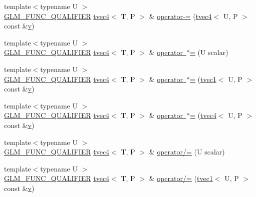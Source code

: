 \begin{DoxyCompactItemize}
\item 
{\footnotesize template$<$typename U $>$ }\\\mbox{\hyperlink{setup_8hpp_a33fdea6f91c5f834105f7415e2a64407}{G\+L\+M\+\_\+\+F\+U\+N\+C\+\_\+\+Q\+U\+A\+L\+I\+F\+I\+ER}} \mbox{\hyperlink{structglm_1_1tvec4}{tvec4}}$<$ T, P $>$ \& \mbox{\hyperlink{structglm_1_1tvec4_a75d65a025aeea5e7351d8c0113fabebb}{operator-\/=}} (\mbox{\hyperlink{structglm_1_1tvec4}{tvec4}}$<$ U, P $>$ const \&\mbox{\hyperlink{glad_8h_a14cfbe2fc2234f5504618905b69d1e06}{v}})
\item 
{\footnotesize template$<$typename U $>$ }\\\mbox{\hyperlink{setup_8hpp_a33fdea6f91c5f834105f7415e2a64407}{G\+L\+M\+\_\+\+F\+U\+N\+C\+\_\+\+Q\+U\+A\+L\+I\+F\+I\+ER}} \mbox{\hyperlink{structglm_1_1tvec4}{tvec4}}$<$ T, P $>$ \& \mbox{\hyperlink{structglm_1_1tvec4_a071e6503cba0d00b1827dc61f39005ba}{operator $\ast$=}} (U scalar)
\item 
{\footnotesize template$<$typename U $>$ }\\\mbox{\hyperlink{setup_8hpp_a33fdea6f91c5f834105f7415e2a64407}{G\+L\+M\+\_\+\+F\+U\+N\+C\+\_\+\+Q\+U\+A\+L\+I\+F\+I\+ER}} \mbox{\hyperlink{structglm_1_1tvec4}{tvec4}}$<$ T, P $>$ \& \mbox{\hyperlink{structglm_1_1tvec4_aafe35b1f77aa35b89fcc7bced2fce0a0}{operator $\ast$=}} (\mbox{\hyperlink{structglm_1_1tvec1}{tvec1}}$<$ U, P $>$ const \&\mbox{\hyperlink{glad_8h_a14cfbe2fc2234f5504618905b69d1e06}{v}})
\item 
{\footnotesize template$<$typename U $>$ }\\\mbox{\hyperlink{setup_8hpp_a33fdea6f91c5f834105f7415e2a64407}{G\+L\+M\+\_\+\+F\+U\+N\+C\+\_\+\+Q\+U\+A\+L\+I\+F\+I\+ER}} \mbox{\hyperlink{structglm_1_1tvec4}{tvec4}}$<$ T, P $>$ \& \mbox{\hyperlink{structglm_1_1tvec4_adb33f6b24ccf8703a1bb5a0885433adf}{operator $\ast$=}} (\mbox{\hyperlink{structglm_1_1tvec4}{tvec4}}$<$ U, P $>$ const \&\mbox{\hyperlink{glad_8h_a14cfbe2fc2234f5504618905b69d1e06}{v}})
\item 
{\footnotesize template$<$typename U $>$ }\\\mbox{\hyperlink{setup_8hpp_a33fdea6f91c5f834105f7415e2a64407}{G\+L\+M\+\_\+\+F\+U\+N\+C\+\_\+\+Q\+U\+A\+L\+I\+F\+I\+ER}} \mbox{\hyperlink{structglm_1_1tvec4}{tvec4}}$<$ T, P $>$ \& \mbox{\hyperlink{structglm_1_1tvec4_a0556c8f92c2267b088c76c883b355ff0}{operator/=}} (U scalar)
\item 
{\footnotesize template$<$typename U $>$ }\\\mbox{\hyperlink{setup_8hpp_a33fdea6f91c5f834105f7415e2a64407}{G\+L\+M\+\_\+\+F\+U\+N\+C\+\_\+\+Q\+U\+A\+L\+I\+F\+I\+ER}} \mbox{\hyperlink{structglm_1_1tvec4}{tvec4}}$<$ T, P $>$ \& \mbox{\hyperlink{structglm_1_1tvec4_a75fde6792f702029d92cfb3502a7e8ea}{operator/=}} (\mbox{\hyperlink{structglm_1_1tvec1}{tvec1}}$<$ U, P $>$ const \&\mbox{\hyperlink{glad_8h_a14cfbe2fc2234f5504618905b69d1e06}{v}})

\end{DoxyCompactItemize}
